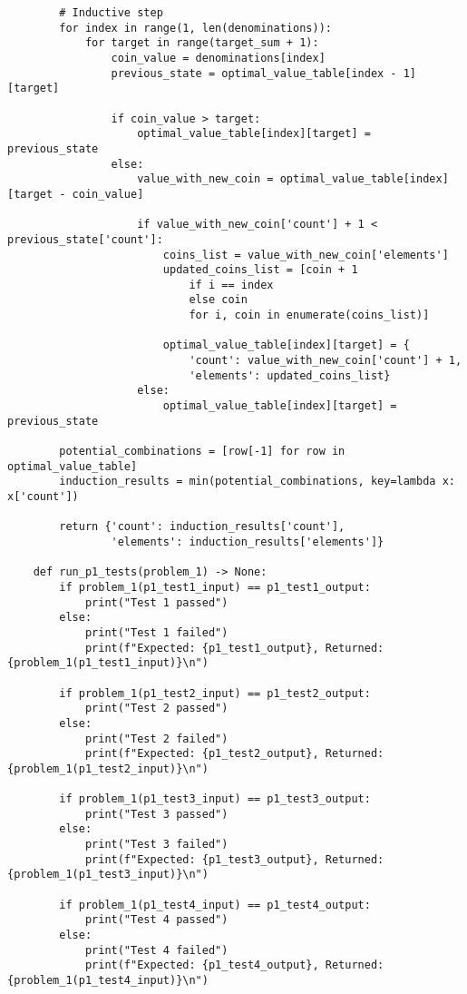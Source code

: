 \documentclass[12pt]{article}
\begin{document}
\begin{verbatim}
        # Inductive step 
        for index in range(1, len(denominations)):
            for target in range(target_sum + 1): 
                coin_value = denominations[index]
                previous_state = optimal_value_table[index - 1][target]

                if coin_value > target:
                    optimal_value_table[index][target] = previous_state
                else: 
                    value_with_new_coin = optimal_value_table[index][target - coin_value]

                    if value_with_new_coin['count'] + 1 < previous_state['count']:
                        coins_list = value_with_new_coin['elements']
                        updated_coins_list = [coin + 1 
                            if i == index 
                            else coin 
                            for i, coin in enumerate(coins_list)]

                        optimal_value_table[index][target] = {
                            'count': value_with_new_coin['count'] + 1, 
                            'elements': updated_coins_list}
                    else: 
                        optimal_value_table[index][target] = previous_state

        potential_combinations = [row[-1] for row in optimal_value_table]
        induction_results = min(potential_combinations, key=lambda x: x['count'])

        return {'count': induction_results['count'], 
                'elements': induction_results['elements']}

    def run_p1_tests(problem_1) -> None:
        if problem_1(p1_test1_input) == p1_test1_output:
            print("Test 1 passed")
        else:
            print("Test 1 failed")
            print(f"Expected: {p1_test1_output}, Returned: {problem_1(p1_test1_input)}\n")

        if problem_1(p1_test2_input) == p1_test2_output:
            print("Test 2 passed")
        else:
            print("Test 2 failed")
            print(f"Expected: {p1_test2_output}, Returned: {problem_1(p1_test2_input)}\n")

        if problem_1(p1_test3_input) == p1_test3_output:
            print("Test 3 passed")
        else:
            print("Test 3 failed")
            print(f"Expected: {p1_test3_output}, Returned: {problem_1(p1_test3_input)}\n")

        if problem_1(p1_test4_input) == p1_test4_output:
            print("Test 4 passed")
        else:
            print("Test 4 failed")
            print(f"Expected: {p1_test4_output}, Returned: {problem_1(p1_test4_input)}\n")


\end{verbatim}
\end{document}
